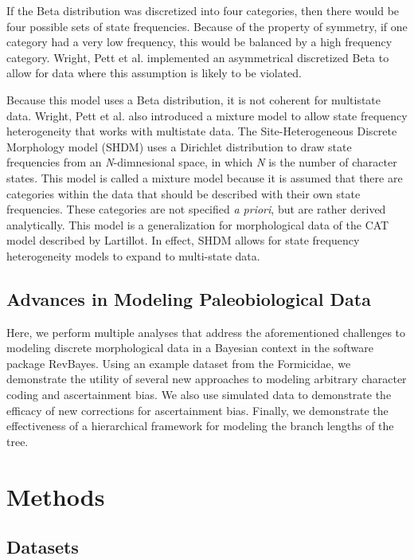 \documentclass[]{article}
\begin{document}
	If the Beta distribution was discretized into four categories, then there would be four possible sets of state frequencies. 
	Because of the property of symmetry, if one category had a very low frequency, this would be balanced by a high frequency category.
	Wright, Pett et al. implemented an asymmetrical discretized Beta to allow for data where this assumption is likely to be violated.\par
	Because this model uses a Beta distribution, it is not coherent for multistate data.
	Wright, Pett et al. also introduced a mixture model to allow state frequency heterogeneity that works with multistate data.
	The Site-Heterogeneous Discrete Morphology model (SHDM) uses a Dirichlet distribution to draw state frequencies from an \textit{N}-dimnesional space, in which \textit{N} is the number of character states. 
	This model is called a mixture model because it is assumed that there are categories within the data that should be described with their own state frequencies. 
	These categories are not specified \textit{a priori}, but are rather derived analytically. 
	This model is a generalization for morphological data of the CAT model described by Lartillot. 
	In effect, SHDM allows for state frequency heterogeneity models to expand to multi-state data.
	\par
	
		
 \subsection{Advances in Modeling Paleobiological Data}
	Here, we perform multiple analyses that address the aforementioned challenges to modeling discrete morphological data in a Bayesian context in the software package RevBayes. 
	Using an example dataset from the Formicidae, we demonstrate the utility of several new approaches to modeling arbitrary character coding and ascertainment bias. 
	We also use simulated data to demonstrate the efficacy of new corrections for ascertainment bias. 
	Finally, we demonstrate the effectiveness of a hierarchical framework for modeling the branch lengths of the tree. \par

	
\section{Methods}

\subsection{Datasets}
\end{document}
